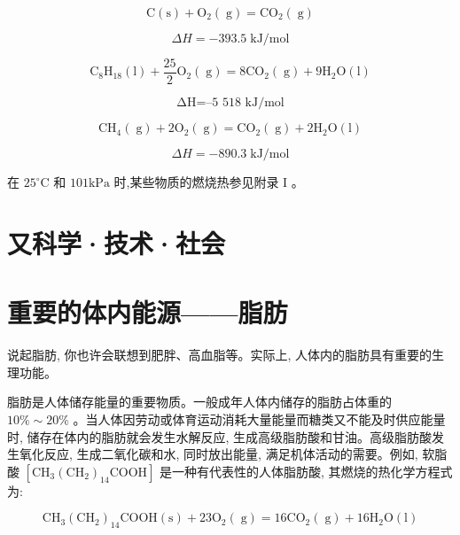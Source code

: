 \documentclass[10pt]{article}
\begin{document}
\[
\mathrm{C}\left( \mathrm{s}\right) + {\mathrm{O}}_{2}\left( \mathrm{\;g}\right) = {\mathrm{{CO}}}_{2}\left( \mathrm{\;g}\right)
\]

\[
{\Delta H} = - {393.5}\mathrm{\;{kJ}}/\mathrm{{mol}}
\]

\[
{\mathrm{C}}_{8}{\mathrm{H}}_{18}\left( \mathrm{l}\right) + \frac{25}{2}{\mathrm{O}}_{2}\left( \mathrm{\;g}\right) = 8{\mathrm{{CO}}}_{2}\left( \mathrm{\;g}\right) + 9{\mathrm{H}}_{2}\mathrm{O}\left( \mathrm{l}\right)
\]

\[
\text{ΔH=–5 518 kJ/mol}
\]

\[
{\mathrm{{CH}}}_{4}\left( \mathrm{\;g}\right) + 2{\mathrm{O}}_{2}\left( \mathrm{\;g}\right) = {\mathrm{{CO}}}_{2}\left( \mathrm{\;g}\right) + 2{\mathrm{H}}_{2}\mathrm{O}\left( \mathrm{l}\right)
\]

\[
{\Delta H} = - {890.3}\mathrm{\;{kJ}}/\mathrm{{mol}}
\]


在 \({25}^{ \circ }\mathrm{C}\) 和 \({101}\mathrm{{kPa}}\) 时,某些物质的燃烧热参见附录 \(\mathrm{I}\) 。

\section*{又科学·技术·社会}

\section*{重要的体内能源——脂肪}

说起脂肪, 你也许会联想到肥胖、高血脂等。实际上, 人体内的脂肪具有重要的生理功能。

脂肪是人体储存能量的重要物质。一般成年人体内储存的脂肪占体重的 \({10}\% \sim {20}\%\) 。当人体因劳动或体育运动消耗大量能量而糖类又不能及时供应能量时, 储存在体内的脂肪就会发生水解反应, 生成高级脂肪酸和甘油。高级脂肪酸发生氧化反应, 生成二氧化碳和水, 同时放出能量, 满足机体活动的需要。例如, 软脂酸 \(\left\lbrack {{\mathrm{{CH}}}_{3}{\left( {\mathrm{{CH}}}_{2}\right) }_{14}\mathrm{{COOH}}}\right\rbrack\) 是一种有代表性的人体脂肪酸, 其燃烧的热化学方程式为:

\[
{\mathrm{{CH}}}_{3}{\left( {\mathrm{{CH}}}_{2}\right) }_{14}\mathrm{{COOH}}\left( \mathrm{s}\right) + {23}{\mathrm{O}}_{2}\left( \mathrm{\;g}\right) = {16}{\mathrm{{CO}}}_{2}\left( \mathrm{\;g}\right) + {16}{\mathrm{H}}_{2}\mathrm{O}\left( \mathrm{l}\right)
\]
\end{document}
